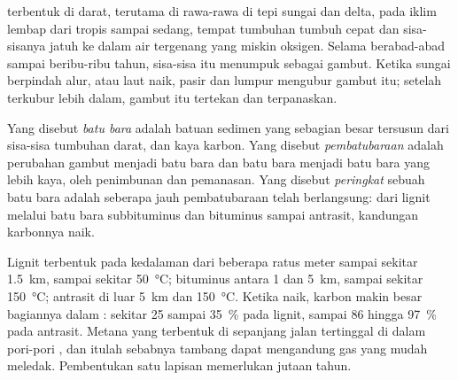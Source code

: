  terbentuk di darat, terutama di rawa-rawa di tepi sungai dan delta,
pada iklim lembap dari tropis sampai sedang, tempat tumbuhan tumbuh cepat dan
sisa-sisanya jatuh ke dalam air tergenang yang miskin oksigen. Selama berabad-abad
sampai beribu-ribu tahun, sisa-sisa itu menumpuk sebagai gambut. Ketika sungai
berpindah alur, atau laut naik, pasir dan lumpur mengubur gambut itu; setelah
terkubur lebih dalam, gambut itu tertekan dan terpanaskan.

\begin{definition}\label{def:g11:fossil-fuel-geology:coal}
Yang disebut \emph{batu bara} adalah batuan sedimen yang
sebagian besar tersusun dari sisa-sisa tumbuhan darat, dan kaya karbon. Yang
disebut \emph{pembatubaraan} adalah perubahan gambut
menjadi batu bara dan batu bara menjadi batu bara yang lebih kaya, oleh
penimbunan dan pemanasan. Yang disebut \emph{peringkat}
sebuah batu bara adalah seberapa jauh pembatubaraan telah berlangsung: dari
lignit melalui batu bara subbituminus dan bituminus sampai antrasit, kandungan
karbonnya naik.
\end{definition}

Lignit terbentuk pada kedalaman dari beberapa ratus meter sampai sekitar
\qty{1.5}{km}, sampai sekitar \qty{50}{\degreeCelsius};  bituminus
antara 1 dan \qty{5}{km}, sampai sekitar \qty{150}{\degreeCelsius}; antrasit
di luar \qty{5}{km} dan \qty{150}{\degreeCelsius}. Ketika  naik,
karbon makin besar bagiannya dalam : sekitar
25 sampai \qty{35}{\percent} pada lignit, sampai 86 hingga \qty{97}{\percent}
pada antrasit. Metana yang terbentuk di sepanjang jalan tertinggal di dalam
pori-pori , dan itulah sebabnya tambang  dapat mengandung gas
yang mudah meledak. Pembentukan satu lapisan  memerlukan jutaan tahun.

